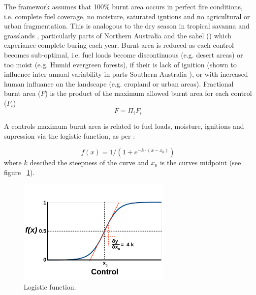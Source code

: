 The framework assumes that 100\% burnt area occurs in perfect fire conditions,  i.e. complete fuel coverage, no moisture, saturated igntions and no agricultural or urban fragmentation. This is analogous to the dry season in tropical savanna and grasslands \citep{kelley2014modelling}, particularly parts of Northern Australia \citep{murphy2013fire} and the sahel () which experiance complete buring each year.
Burnt area is reduced as each control becomes sub-optimal, i.e.
    fuel loads become discontinuous  (e.g. desert areas)
    or too moist (e.g. Humid evergreen forests),
    if their is lack of ignition (shown to influence inter annual variability in parts Southern Australia \cite{bradstock2010biogeographic} ),
    or with increased human influance on the landscape (e.g. cropland or urban areas).
Fractional burnt area ($F$) is the product of the maximum allowed burnt area for each control ($F_i$)
\begin{equation}
    F=\Pi_{i} F_i
    \label{equ:LimFIRE}
\end{equation}

A controls maximum burnt area is related to fuel loads, moisture, ignitions and supression via the logistic function, as per \citet{bistinas2014causal}:

\begin{equation}
    f(x) = 1 / (1 + e^{-k \cdot (x - x_0)})
    \label{equ:fx}
\end{equation}
where $k$ descibed the steepness of the curve and $x_0$ is the curves midpoint (see figure ~\ref{fig:Logistic_fun}).

\begin{figure}[!ht]
  \centering
    \includegraphics[width=0.67\textwidth]{Logistic_fun.pdf}
  \caption{Logistic function.}
  \label{fig:Logistic_fun}
\end{figure}

